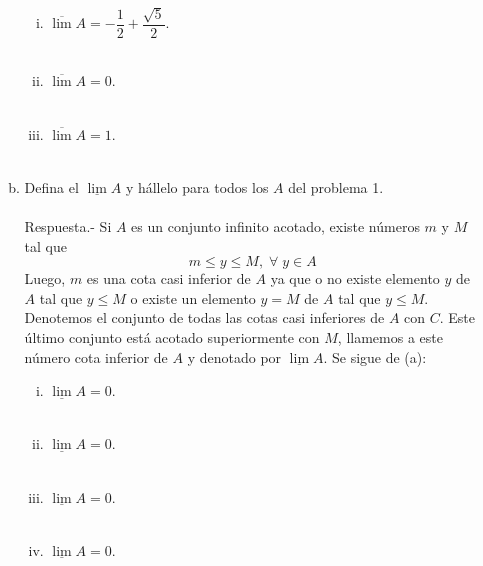 \begin{enumerate}[\bfseries 1.]
\begin{enumerate}[(a)]
\begin{enumerate}[(i)]
		    \item $\overline{\lim} A = -\dfrac{1}{2}+\dfrac{\sqrt{5}}{2}$.\\\\

		    \item $\overline{\lim} A = 0$.\\\\

		    \item $\overline{\lim} A = 1$.\\\\

		\end{enumerate}

	    \item Defina el $\underline{\lim} A$ y hállelo para todos los $A$ del problema 1.\\\\
		Respuesta.-\; Si $A$ es un conjunto infinito acotado, existe números $m$ y $M$ tal que
		$$m\leq y \leq M,\; \forall \; y \in A$$
		Luego, $m$ es una cota casi inferior de $A$ ya que o no existe elemento $y$ de $A$ tal que $y\leq M$ o existe un elemento $y=M$ de $A$ tal que $y\leq M$. Denotemos el conjunto de todas las cotas casi inferiores de $A$ con $C$. Este último conjunto está acotado superiormente con $M$, llamemos a este número cota inferior de $A$ y denotado por $\underline{\lim} A$. Se sigue de (a):\\

		\begin{enumerate}[(i)]

		    \item $\underline{\lim} A = 0$.\\\\

		    \item $\underline{\lim} A = 0$.\\\\

		    \item $\underline{\lim} A = 0$.\\\\

		    \item $\underline{\lim} A = 0$.\\\\


\end{enumerate}
\end{enumerate}
\end{enumerate}
